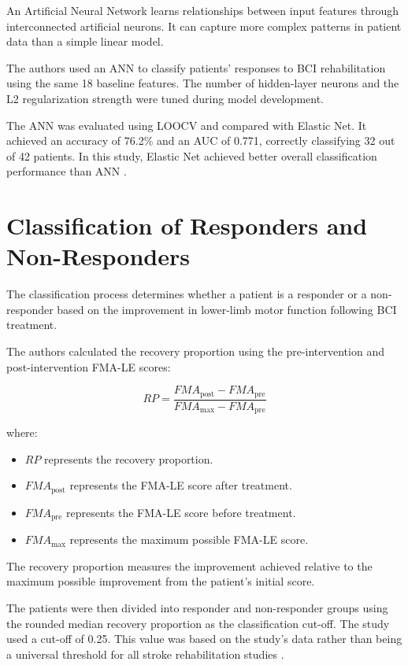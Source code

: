 An Artificial Neural Network learns relationships between input features through interconnected artificial neurons. It can capture more complex patterns in patient data than a simple linear model.

The authors used an ANN to classify patients' responses to BCI rehabilitation using the same 18 baseline features. The number of hidden-layer neurons and the L2 regularization strength were tuned during model development.

The ANN was evaluated using LOOCV and compared with Elastic Net. It achieved an accuracy of 76.2\% and an AUC of 0.771, correctly classifying 32 out of 42 patients. In this study, Elastic Net achieved better overall classification performance than ANN \cite{bib1}.

\section{{Classification of Responders and Non-Responders}}

The classification process determines whether a patient is a responder or a non-responder based on the improvement in lower-limb motor function following BCI treatment.

The authors calculated the recovery proportion using the pre-intervention and post-intervention FMA-LE scores:

\begin{equation}
RP = \frac{FMA_{\text{post}} - FMA_{\text{pre}}}
{FMA_{\max} - FMA_{\text{pre}}}
\end{equation}

where:

\begin{itemize}
    \item $RP$ represents the recovery proportion.
    \item $FMA_{\text{post}}$ represents the FMA-LE score after treatment.
    \item $FMA_{\text{pre}}$ represents the FMA-LE score before treatment.
    \item $FMA_{\max}$ represents the maximum possible FMA-LE score.
\end{itemize}

The recovery proportion measures the improvement achieved relative to the maximum possible improvement from the patient's initial score.

The patients were then divided into responder and non-responder groups using the rounded median recovery proportion as the classification cut-off. The study used a cut-off of 0.25. This value was based on the study's data rather than being a universal threshold for all stroke rehabilitation studies \cite{bib1}.

